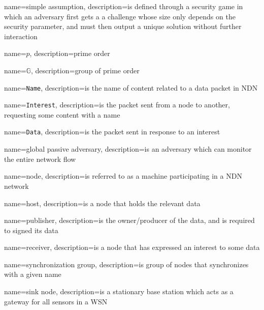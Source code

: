 {
  name=simple assumption,
  description={is defined through a security game in which an adversary first gets a a challenge whose size only depends on the security
  parameter, and must then output a unique solution without further interaction~\cite{DBLP:conf/pkc/HofheinzKS15}}
}

{
  name=$p$,
  description={prime order}
}

{
  name=$\mathbb{G}$,
  description={group of prime order}
}

{
  name=\texttt{Name},
  description={is the name of content related to a \gls{data} packet in NDN}
}

{
  name=\texttt{Interest},
  description={is the packet sent from a node to another, requesting some content with a \gls{name}}
}


{
  name=\texttt{Data},
  description={is the packet sent in response to an \gls{interest}}
}

{
  name=global passive adversary,
  description={is an adversary which can monitor the entire network flow}
}

{
  name=node,
  description={is referred to as a machine participating in a \gls{NDN} network}
}

{
  name=host,
  description={is a node that holds the relevant \gls{data}}
}

{
  name=publisher,
  description={is the owner/producer of the \gls{data}, and is required to signed its \gls{data}}
}

{
  name=receiver,
  description={is a node that has expressed an \gls{interest} to some \gls{data}}
}

{
  name=synchronization group,
  description={is group of nodes that synchronizes with a given \gls{name}}
}

{
  name=sink node,
  description={is a stationary base station which acts as a gateway for all sensors in a WSN~\cite[Section 1.1]{Patil:2012:SWS:2464778}}
}